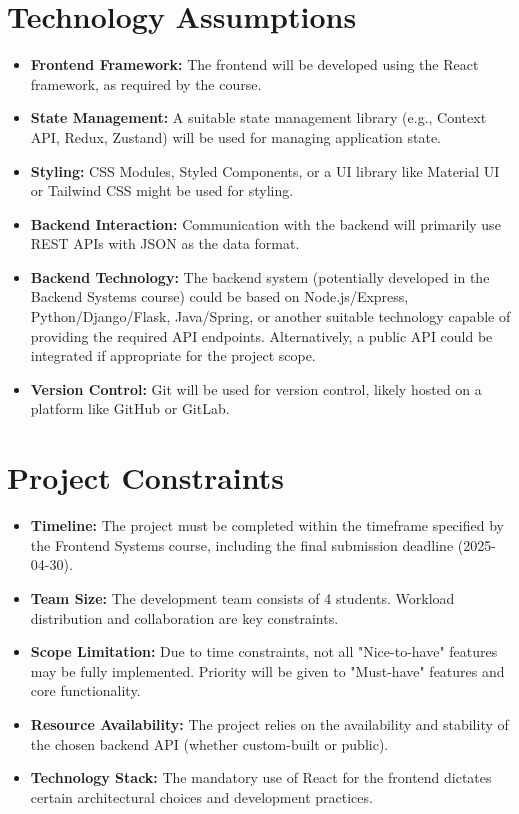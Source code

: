 \documentclass[a4paper,11pt]{article}
\begin{document}
\section{Technology Assumptions}
\begin{itemize}
    \item \textbf{Frontend Framework:} The frontend will be developed using the React framework, as required by the course.
    \item \textbf{State Management:} A suitable state management library (e.g., Context API, Redux, Zustand) will be used for managing application state.
    \item \textbf{Styling:} CSS Modules, Styled Components, or a UI library like Material UI or Tailwind CSS might be used for styling.
    \item \textbf{Backend Interaction:} Communication with the backend will primarily use REST APIs with JSON as the data format.
    \item \textbf{Backend Technology:} The backend system (potentially developed in the Backend Systems course) could be based on Node.js/Express, Python/Django/Flask, Java/Spring, or another suitable technology capable of providing the required API endpoints. Alternatively, a public API could be integrated if appropriate for the project scope.
    \item \textbf{Version Control:} Git will be used for version control, likely hosted on a platform like GitHub or GitLab.
\end{itemize}

\section{Project Constraints}
\begin{itemize}
    \item \textbf{Timeline:} The project must be completed within the timeframe specified by the Frontend Systems course, including the final submission deadline (2025-04-30).
    \item \textbf{Team Size:} The development team consists of 4 students. Workload distribution and collaboration are key constraints.
    \item \textbf{Scope Limitation:} Due to time constraints, not all "Nice-to-have" features may be fully implemented. Priority will be given to "Must-have" features and core functionality.
    \item \textbf{Resource Availability:} The project relies on the availability and stability of the chosen backend API (whether custom-built or public).
    \item \textbf{Technology Stack:} The mandatory use of React for the frontend dictates certain architectural choices and development practices.
\end{itemize}
\end{document}
